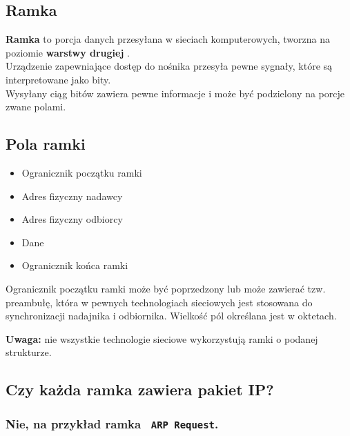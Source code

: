 \documentclass[../sk-egzamin.tex]{subfiles}
\begin{document}

\subsection*{Ramka}
\textbf{Ramka} to porcja danych przesyłana w sieciach komputerowych, tworzna
na poziomie \textbf{warstwy drugiej} .\\
Urządzenie zapewniające dostęp do nośnika przesyła pewne sygnały, które są
interpretowane jako bity.\\
Wysyłany ciąg bitów zawiera pewne informacje i może być podzielony na porcje
zwane polami.

\subsection*{Pola ramki}
\begin{itemize}
    \item Ogranicznik początku ramki 
    \item Adres fizyczny nadawcy 
    \item Adres fizyczny odbiorcy 
    \item Dane
    \item Ogranicznik końca ramki 
\end{itemize}

Ogranicznik początku ramki może być poprzedzony lub może zawierać tzw.
preambułę, która w pewnych technologiach sieciowych jest stosowana do
synchronizacji nadajnika i odbiornika. Wielkość pól określana jest w oktetach.

\textbf{Uwaga:} nie wszystkie technologie sieciowe wykorzystują ramki o podanej
strukturze.

\subsection*{Czy każda ramka zawiera pakiet IP?}
\subsubsection*{Nie, na przykład ramka \texttt{ ARP Request}.}

\pagebreak
\end{document}
